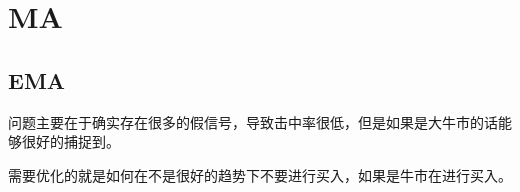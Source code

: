 \chapter{MA}
\section{EMA}
问题主要在于确实存在很多的假信号，导致击中率很低，但是如果是大牛市的话能够很好的捕捉到。

需要优化的就是如何在不是很好的趋势下不要进行买入，如果是牛市在进行买入。